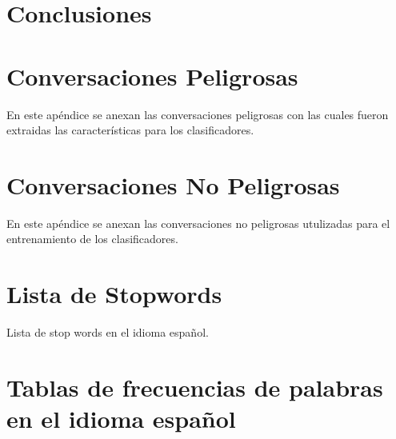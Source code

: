 \documentclass[oneside,10pt]{book}
\begin{document}



\chapter{Conclusiones}





\appendix
\chapter{Conversaciones Peligrosas}\label{app:conversaciones}
En este ap\'endice se anexan las conversaciones peligrosas con las cuales fueron extraidas las caracter\'isticas para los clasificadores.

















%























\chapter{Conversaciones No Peligrosas}\label{app:conversacionesnp}
En este ap\'endice se anexan las conversaciones no peligrosas utulizadas para el entrenamiento de los clasificadores.
%
%







%
%

%
%


%

%




\chapter{Lista de Stopwords}
\label{chap:stop}
Lista de stop words en el idioma espa\~nol.\cite{stop}
\chapter{Tablas de frecuencias de palabras en el idioma espa\~nol}
	
\end{document}
